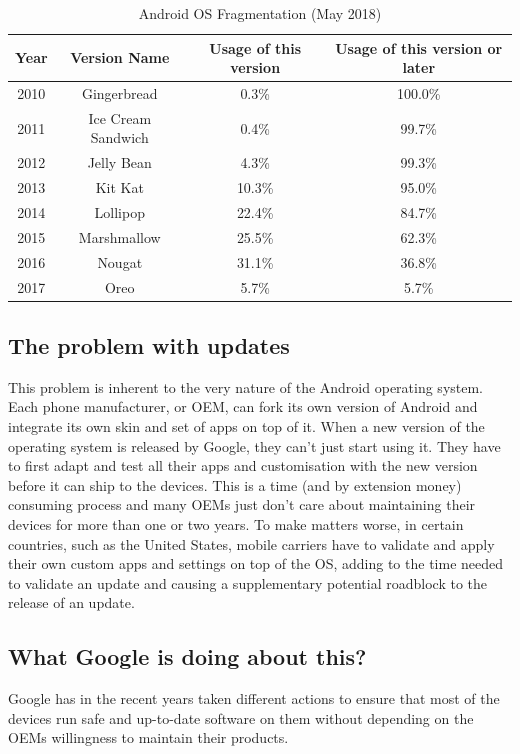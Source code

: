 \documentclass[11pt,a4paper]{report}
\begin{document}
\begin{table}[H]
\centering
\bgroup
\def\arraystretch{1.5}%
\begin{tabular}{|c|c|c|c|}
\hline
  \textbf{Year} & \textbf{Version Name} & \textbf{Usage of this version} & \textbf{Usage of this version or later}\\
  \hline
2010 & Gingerbread & 0.3\% & 100.0\% \\
\hline
2011 & Ice Cream Sandwich & 0.4\% & 99.7\% \\
\hline
2012 & Jelly Bean & 4.3\% & 99.3\% \\
\hline
2013 & Kit Kat & 10.3\% & 95.0\% \\
\hline
2014 & Lollipop & 22.4\% & 84.7\% \\
\hline
2015 & Marshmallow & 25.5\% & 62.3\% \\
\hline
2016 & Nougat & 31.1\% & 36.8\% \\
\hline
2017 & Oreo & 5.7\% & 5.7\% \\
\hline
\end{tabular}
\egroup
\label{android_os_table}
\caption{Android OS Fragmentation (May 2018)\cite{android:dev:osfragmentation}}
\end{table}

\subsection{The problem with updates}
This problem is inherent to the very nature of the Android operating system. Each phone manufacturer, or OEM, can fork its own version of Android and integrate its own skin and set of apps on top of it. When a new version of the operating system is released by Google, they can't just start using it. They have to first adapt and test all their apps and customisation with the new version before it can ship to the devices. This is a time (and by extension money) consuming process and many OEMs just don't care about maintaining their devices for more than one or two years. To make matters worse, in certain countries, such as the United States, mobile carriers have to validate and apply their own custom apps and settings on top of the OS, adding to the time needed to validate an update and causing a supplementary potential roadblock to the release of an update.

\subsection{What Google is doing about this?}
Google has in the recent years taken different actions to ensure that most of the devices run safe and up-to-date software on them without depending on the OEMs willingness to maintain their products.
\end{document}
